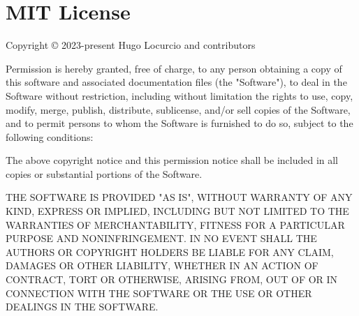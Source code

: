 \chapter{MIT License }
\hypertarget{md_addons_2debug__menu_2_l_i_c_e_n_s_e}{}\label{md_addons_2debug__menu_2_l_i_c_e_n_s_e}
\label{md_addons_2debug__menu_2_l_i_c_e_n_s_e_autotoc_md12}%
%


Copyright © 2023-\/present Hugo Locurcio and contributors

Permission is hereby granted, free of charge, to any person obtaining a copy of this software and associated documentation files (the "{}\+Software"{}), to deal in the Software without restriction, including without limitation the rights to use, copy, modify, merge, publish, distribute, sublicense, and/or sell copies of the Software, and to permit persons to whom the Software is furnished to do so, subject to the following conditions\+:

The above copyright notice and this permission notice shall be included in all copies or substantial portions of the Software.

THE SOFTWARE IS PROVIDED "{}\+AS IS"{}, WITHOUT WARRANTY OF ANY KIND, EXPRESS OR IMPLIED, INCLUDING BUT NOT LIMITED TO THE WARRANTIES OF MERCHANTABILITY, FITNESS FOR A PARTICULAR PURPOSE AND NONINFRINGEMENT. IN NO EVENT SHALL THE AUTHORS OR COPYRIGHT HOLDERS BE LIABLE FOR ANY CLAIM, DAMAGES OR OTHER LIABILITY, WHETHER IN AN ACTION OF CONTRACT, TORT OR OTHERWISE, ARISING FROM, OUT OF OR IN CONNECTION WITH THE SOFTWARE OR THE USE OR OTHER DEALINGS IN THE SOFTWARE. 